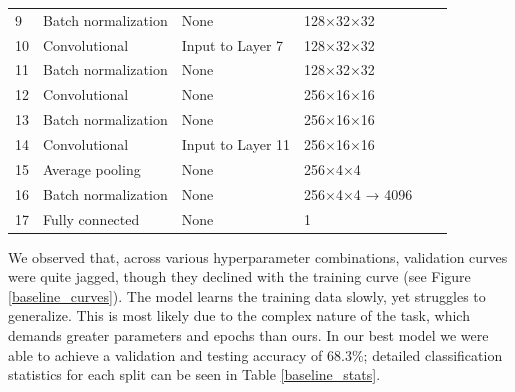 \documentclass{article} %
\begin{document}
\begin{table}[t]
\begin{center}
\begin{tabular}{llllll}
            9                                 & Batch normalization                & None                                         & 128×32×32                                         \\
            10                                & Convolutional                      & Input to Layer 7                             & 128×32×32                                         \\
            11                                & Batch normalization                & None                                         & 128×32×32                                         \\
            12                                & Convolutional                      & None                                         & 256×16×16                                         \\
            13                                & Batch normalization                & None                                         & 256×16×16                                         \\
            14                                & Convolutional                      & Input to Layer 11                            & 256×16×16                                         \\
            15                                & Average pooling                    & None                                         & 256×4×4                                           \\
            16                                & Batch normalization                & None                                         & 256×4×4 → 4096                                    \\
            17                                & Fully connected                    & None                                         & 1                                                 \\
        \end{tabular}
    \end{center}
\end{table}

We observed that, across various hyperparameter combinations, validation curves were quite jagged, though they declined with the training curve (see Figure \ref{baseline_curves}). The model learns the training data slowly, yet struggles to generalize. This is most likely due to the complex nature of the task, which demands greater parameters and epochs than ours. In our best model we were able to achieve a validation and testing accuracy of $68.3\%$; detailed classification statistics for each split can be seen in Table \ref{baseline_stats}.
\end{document}
